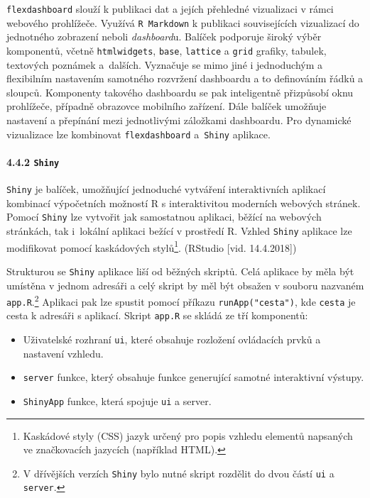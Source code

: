 \documentclass[12pt,]{article}
\providecommand{\tightlist}{%
  \setlength{\itemsep}{0pt}\setlength{\parskip}{0pt}}
\let\oldparagraph\paragraph
\renewcommand{\paragraph}[1]{\oldparagraph{#1}\mbox{}}
\let\rmarkdownfootnote\footnote%
\def\footnote{\protect\rmarkdownfootnote}
\begin{document}
\qquad \texttt{flexdashboard} slouží k publikaci dat a jejích přehledné
vizualizaci v rámci webového prohlížeče. Využívá \texttt{R\ Markdown} k
publikaci souvisejících vizualizací do jednotného zobrazení neboli
\emph{dashboard}u. Balíček podporuje široký výběr komponentů, včetně
\texttt{htmlwidgets}, \texttt{base}, \texttt{lattice} a \texttt{grid}
grafiky, tabulek, textových poznámek a~dalších. Vyznačuje se mimo jiné i
jednoduchým a flexibilním nastavením samotného rozvržení dashboardu a to
definováním řádků a sloupců. Komponenty takového dashboardu se pak
inteligentně přizpůsobí oknu prohlížeče, případně obrazovce mobilního
zařízení. Dále balíček umožňuje nastavení a přepínání mezi jednotlivými
záložkami dashboardu. Pro dynamické vizualizace lze kombinovat
\texttt{flexdashboard} a~\texttt{Shiny} aplikace. \vspace*{-0.2cm}

\hypertarget{shiny}{\paragraph{\texorpdfstring{4.4.2
\texttt{Shiny}}{4.4.2 Shiny}}\label{shiny}}

\qquad \texttt{Shiny} je balíček, umožňující jednoduché vytváření
interaktivních aplikací kombinací výpočetních možností R s
interaktivitou moderních webových stránek. Pomocí \texttt{Shiny} lze
vytvořit jak samostatnou aplikaci, běžící na webových stránkách, tak
i~lokální aplikaci bežící v prostředí R. Vzhled \texttt{Shiny} aplikace
lze modifikovat pomocí kaskádových stylů\footnote{Kaskádové styly (CSS)
  jazyk určený pro popis vzhledu elementů napsaných ve značkovacích
  jazycích (například HTML).}. (RStudio {[}vid. 14.4.2018{]})

\qquad Strukturou se \texttt{Shiny} aplikace liší od běžných skriptů.
Celá aplikace by měla být umístěna v jednom adresáři a celý skript by
měl být obsažen v souboru nazvaném \texttt{app.R}.\footnote{V dřívějších
  verzích \texttt{Shiny} bylo nutné skript rozdělit do dvou částí
  \texttt{ui} a \texttt{server}.} Aplikaci pak lze spustit pomocí
příkazu \texttt{runApp("cesta")}, kde \texttt{cesta} je cesta k adresáři
s aplikací. Skript \texttt{app.R} se skládá ze tří komponentů:

\begin{itemize}
\tightlist
\item
  Uživatelské rozhraní \texttt{ui}, které obsahuje rozložení ovládacích
  prvků a nastavení vzhledu.
\item
  \texttt{server} funkce, který obsahuje funkce generující samotné
  interaktivní výstupy.
\item
  \texttt{ShinyApp} funkce, která spojuje \texttt{ui} a server. \newline
\end{itemize}
\end{document}
